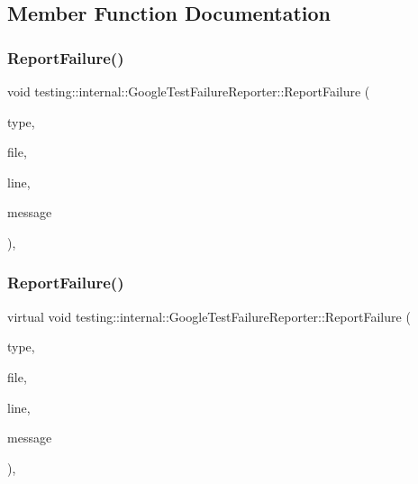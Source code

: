 \subsection{Member Function Documentation}
\mbox{\label{classtesting_1_1internal_1_1_google_test_failure_reporter_aff7bfa8521e770d718172c99c807ec39}} 
\subsubsection{\texorpdfstring{ReportFailure()}{ReportFailure()}\hspace{0.1cm}{\footnotesize\ttfamily [1/3]}}
{\footnotesize\ttfamily void testing\+::internal\+::\+Google\+Test\+Failure\+Reporter\+::\+Report\+Failure (\begin{DoxyParamCaption}\item[{\mbox{\hyperlink{googletest-master_2googletest_2test_2gtest__environment__test_8cc_aa43ad7e2c1c5c5150ba8d95607a96263}{Failure\+Type}}}]{type,  }\item[{const char $\ast$}]{file,  }\item[{int}]{line,  }\item[{const std\+::string \&}]{message }\end{DoxyParamCaption})\hspace{0.3cm}{\ttfamily [inline]}, {\ttfamily [override]}}

\mbox{\label{classtesting_1_1internal_1_1_google_test_failure_reporter_a096dae47177340acac5f3d6528b852ca}} 
\subsubsection{\texorpdfstring{ReportFailure()}{ReportFailure()}\hspace{0.1cm}{\footnotesize\ttfamily [2/3]}}
{\footnotesize\ttfamily virtual void testing\+::internal\+::\+Google\+Test\+Failure\+Reporter\+::\+Report\+Failure (\begin{DoxyParamCaption}\item[{\mbox{\hyperlink{googletest-master_2googletest_2test_2gtest__environment__test_8cc_aa43ad7e2c1c5c5150ba8d95607a96263}{Failure\+Type}}}]{type,  }\item[{const char $\ast$}]{file,  }\item[{int}]{line,  }\item[{const std\+::string \&}]{message }\end{DoxyParamCaption})\hspace{0.3cm}{\ttfamily [inline]}, {\ttfamily [virtual]}}


